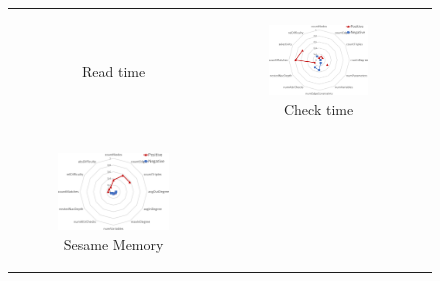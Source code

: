 \begin{figure}[tp]
\begin{center}
\begin{tabular}{c c c}
\begin{subfigure}[t]{0.31\textwidth}
	    \caption{\incquery{} Read time}\end{subfigure} &
	    \begin{subfigure}[t]{0.31\textwidth}\centering
	    \includegraphics[width=0.95\textwidth]{figures/spider-iq-check.pdf}
	    \caption{\incquery{} Check time}\end{subfigure} \\
	    \begin{subfigure}[t]{0.31\textwidth}\centering
	    \includegraphics[width=0.95\textwidth]{figures/spider-sesame-memory.pdf}
	    \caption{Sesame Memory}\end{subfigure} &
	    \begin{subfigure}[t]{0.31\textwidth}\centering

\end{subfigure}
\end{tabular}
\end{center}
\end{figure}

